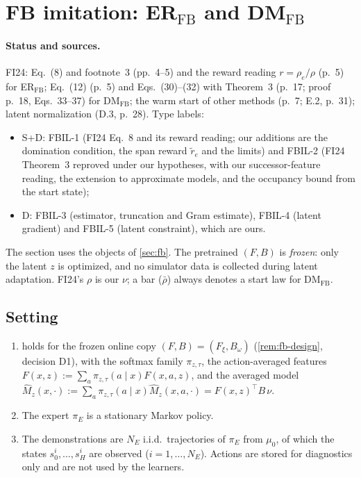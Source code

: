 \section{FB imitation: \texorpdfstring{ER$_{\mathrm{FB}}$ and DM$_{\mathrm{FB}}$}{ER-FB and DM-FB}}\label{sec:fbil}

\paragraph{Status and sources.}
FI24: Eq.~(8) and footnote~3 (pp.~4--5) and the reward reading $r=\rho_e/\rho$ (p.~5) for ER$_{\mathrm{FB}}$; Eq.~(12) (p.~5) and Eqs.~(30)--(32) with Theorem~3 (p.~17; proof p.~18, Eqs.~33--37) for DM$_{\mathrm{FB}}$; the warm start of other methods (p.~7; E.2, p.~31); latent normalization (D.3, p.~28).
Type labels:
\begin{itemize}[nosep]
\item \textsf{S+D}: FBIL-1 (FI24 Eq.~8 and its reward reading; our additions are the domination condition, the span reward $\tilde r_e$ and the limits) and FBIL-2 (FI24 Theorem~3 reproved under our hypotheses, with our successor-feature reading, the extension to approximate models, and the occupancy bound from the start state);
\item \textsf{D}: FBIL-3 (estimator, truncation and Gram estimate), FBIL-4 (latent gradient) and FBIL-5 (latent constraint), which are ours.
\end{itemize}
The section uses the objects of \cref{sec:fb}. The pretrained $(F,B)$ is \emph{frozen}: only the latent $z$ is optimized, and no simulator data is collected during latent adaptation.
FI24's $\rho$ is our $\nu$; a bar ($\bar\rho$) always denotes a start law for DM$_{\mathrm{FB}}$.

\subsection{Setting}\label{sec:fbil-setting}

\begin{assumption}[A-FBIL]\label{ass:fbil}
\leavevmode
\begin{enumerate}[nosep,label=(\roman*)]
\item {} holds for the frozen online copy $(F,B)=(F_\xi,B_\omega)$ (\cref{rem:fb-design}, decision D1), with the softmax family $\pi_{z,\tau}$, the action-averaged features $F(x,z):=\sum_a\pi_{z,\tau}(a\mid x)F(x,a,z)$, and the averaged model $\hat M_z(x,\cdot):=\sum_a\pi_{z,\tau}(a\mid x)\hat M_z(x,a,\cdot)=F(x,z)^\top B\,\nu$.
\item {} The expert $\pi_E$ is a stationary Markov policy.
\item The demonstrations are $N_E$ i.i.d.\ trajectories of $\pi_E$ from $\mu_0$, of which the states $s^i_0,\dots,s^i_H$ are observed ($i=1,\dots,N_E$). Actions are stored for diagnostics only and are not used by the learners.
\end{enumerate}
\end{assumption}

